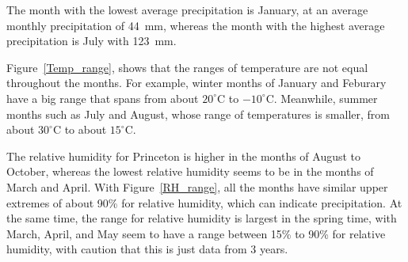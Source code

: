 \documentclass[11pt]{report}
\begin{document}
The month with the lowest average precipitation is January, at an average
monthly precipitation of 44~mm, whereas the month with the highest average
precipitation is July with 123~mm.

Figure~\ref{Temp_range}, shows that the ranges of temperature are not equal
throughout the months. For example, winter months of January and Feburary
have a big range that spans from about $20 ^\circ $C to $-10
^\circ$C. Meanwhile, summer months such as July and August, whose
range of temperatures is smaller, from about $30 ^\circ $C to about $15
^\circ $C.

The relative humidity for Princeton is higher in the months of
August to October, whereas the lowest relative humidity seems to be in the
months of March and April.  With Figure~\ref{RH_range}, all
the months have similar upper extremes of about 90\% for relative humidity,
which can indicate precipitation. At the same time, the range for relative
humidity is largest in the spring time, with March, April, and May seem to
have a range between 15\% to 90\% for relative humidity, with caution that
this is just data from 3 years.
\end{document}
